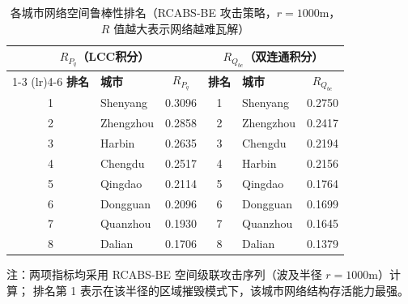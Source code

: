 \begin{table}[htbp]
  \centering
  \caption{各城市网络空间鲁棒性排名（RCABS-BE 攻击策略，$r=1000$m，$R$ 值越大表示网络越难瓦解）}
  \label{tab:Q4_spatial_robustness_ranking}
  \begin{tabular}{clcclc}
    \toprule
    \multicolumn{3}{c}{\(R_{P_q}\)（LCC积分）} & \multicolumn{3}{c}{\(R_{Q_{bc}}\)（双连通积分）} \\
    \cmidrule(lr){1-3} \cmidrule(lr){4-6}
    \textbf{排名} & \textbf{城市} & \(R_{P_q}\) &
    \textbf{排名} & \textbf{城市} & \(R_{Q_{bc}}\) \\
    \midrule
    1 & Shenyang  & 0.3096 & 1 & Shenyang  & 0.2750 \\
    2 & Zhengzhou & 0.2858 & 2 & Zhengzhou & 0.2417 \\
    3 & Harbin    & 0.2635 & 3 & Chengdu   & 0.2194 \\
    4 & Chengdu   & 0.2517 & 4 & Harbin    & 0.2156 \\
    5 & Qingdao   & 0.2114 & 5 & Qingdao   & 0.1764 \\
    6 & Dongguan  & 0.2096 & 6 & Dongguan  & 0.1699 \\
    7 & Quanzhou  & 0.1930 & 7 & Quanzhou  & 0.1645 \\
    8 & Dalian    & 0.1706 & 8 & Dalian    & 0.1379 \\
    \bottomrule
  \end{tabular}
  \begin{minipage}{\linewidth}
    \vspace{2pt}
    \footnotesize 注：两项指标均采用 RCABS-BE 空间级联攻击序列（波及半径 $r=1000$m）计算；
    排名第 1 表示在该半径的区域摧毁模式下，该城市网络结构存活能力最强。
  \end{minipage}
\end{table}
